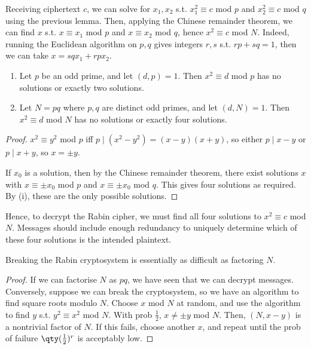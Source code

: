 Receiving ciphertext $c$, we can solve for $x_1, x_2$ s.t. $x_1^2 \equiv c$ mod $p$ and $x_2^2 \equiv c$ mod $q$ using the previous lemma.
Then, applying the Chinese remainder theorem, we can find $x$ s.t. $x \equiv x_1$ mod $p$ and $x \equiv x_2$ mod $q$, hence $x^2 \equiv c$ mod $N$.
Indeed, running the Euclidean algorithm on $p, q$ gives integers $r, s$ s.t. $rp + sq = 1$, then we can take $x = sqx_1 + rpx_2$.
\begin{lemma}
    \begin{enumerate}
        \item Let $p$ be an odd prime, and let $(d, p) = 1$.
        Then $x^2 \equiv d$ mod $p$ has no solutions or exactly two solutions.
        \item Let $N = pq$ where $p, q$ are distinct odd primes, and let $(d, N) = 1$.
        Then $x^2 \equiv d$ mod $N$ has no solutions or exactly four solutions.
    \end{enumerate}
\end{lemma}
\begin{proof}
    $x^2 \equiv y^2$ mod $p$ iff $p \mid (x^2 - y^2) = (x-y)(x+y)$, so either $p \mid x-y$ or $p \mid x+y$, so $x = \pm y$.

    If $x_0$ is a solution, then by the Chinese remainder theorem, there exist solutions $x$ with $x \equiv \pm x_0$ mod $p$ and $x \equiv \pm x_0$ mod $q$.
    This gives four solutions as required.
    By (i), these are the only possible solutions.
\end{proof}
Hence, to decrypt the Rabin cipher, we must find all four solutions to $x^2 \equiv c$ mod $N$.
Messages should include enough redundancy to uniquely determine which of these four solutions is the intended plaintext.
\begin{theorem}
    Breaking the Rabin cryptosystem is essentially as difficult as factoring $N$.
\end{theorem}
\begin{proof}
    If we can factorise $N$ as $pq$, we have seen that we can decrypt messages.
    Conversely, suppose we can break the cryptosystem, so we have an algorithm to find square roots modulo $N$.
    Choose $x$ mod $N$ at random, and use the algorithm to find $y$ s.t. $y^2 \equiv x^2$ mod $N$.
    With prob $\frac{1}{2}$, $x \neq \pm y$ mod $N$.
    Then, $(N, x-y)$ is a nontrivial factor of $N$.
    If this fails, choose another $x$, and repeat until the prob of failure $\qty(\frac{1}{2})^r$ is acceptably low.
\end{proof}


